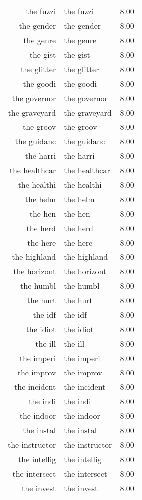 \begin{table}[ht]
\begin{tabular}{rlr}
  the fuzzi & the fuzzi & 8.00 \\ 
  the gender & the gender & 8.00 \\ 
  the genre & the genre & 8.00 \\ 
  the gist & the gist & 8.00 \\ 
  the glitter & the glitter & 8.00 \\ 
  the goodi & the goodi & 8.00 \\ 
  the governor & the governor & 8.00 \\ 
  the graveyard & the graveyard & 8.00 \\ 
  the groov & the groov & 8.00 \\ 
  the guidanc & the guidanc & 8.00 \\ 
  the harri & the harri & 8.00 \\ 
  the healthcar & the healthcar & 8.00 \\ 
  the healthi & the healthi & 8.00 \\ 
  the helm & the helm & 8.00 \\ 
  the hen & the hen & 8.00 \\ 
  the herd & the herd & 8.00 \\ 
  the here & the here & 8.00 \\ 
  the highland & the highland & 8.00 \\ 
  the horizont & the horizont & 8.00 \\ 
  the humbl & the humbl & 8.00 \\ 
  the hurt & the hurt & 8.00 \\ 
  the idf & the idf & 8.00 \\ 
  the idiot & the idiot & 8.00 \\ 
  the ill & the ill & 8.00 \\ 
  the imperi & the imperi & 8.00 \\ 
  the improv & the improv & 8.00 \\ 
  the incident & the incident & 8.00 \\ 
  the indi & the indi & 8.00 \\ 
  the indoor & the indoor & 8.00 \\ 
  the instal & the instal & 8.00 \\ 
  the instructor & the instructor & 8.00 \\ 
  the intellig & the intellig & 8.00 \\ 
  the intersect & the intersect & 8.00 \\ 
  the invest & the invest & 8.00 \\ 

\end{tabular}
\end{table}

